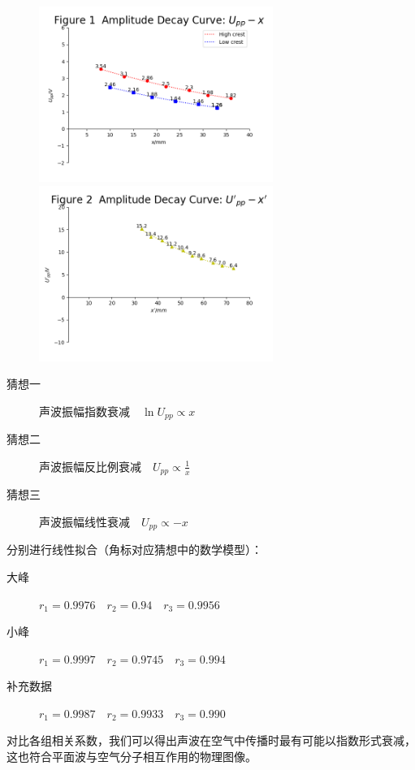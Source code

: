 \documentclass[12pt, a4paper]{ctexart}
\begin{document}
\begin{figure}[htbp]
  \centering
  \includegraphics[width = 3in]{Figure_1.png}
  \quad
  \includegraphics[width = 3in]{Figure_2.png}
\end{figure}

\begin{description}
    \item[猜想一] 声波振幅指数衰减$\quad \ln{U_{pp}} \propto x$
    \item[猜想二] 声波振幅反比例衰减$\quad U_{pp} \propto \frac1x $
    \item[猜想三] 声波振幅线性衰减$\quad U_{pp} \propto -x$
\end{description}

分别进行线性拟合（角标对应猜想中的数学模型）：
\begin{description}
    \item[大峰] $r_1 = 0.9976 \quad r_2 = 0.94 \quad r_3 = 0.9956$
    \item[小峰] $r_1 = 0.9997 \quad r_2 = 0.9745 \quad r_3 = 0.994$
    \item[补充数据\footnotemark] $r_1 = 0.9987 \quad r_2 = 0.9933 \quad r_3 = 0.990$
\end{description}

对比各组相关系数，我们可以得出声波在空气中传播时最有可能以指数形式衰减，这也符合平面波与空气分子相互作用的物理图像。
\end{document}
